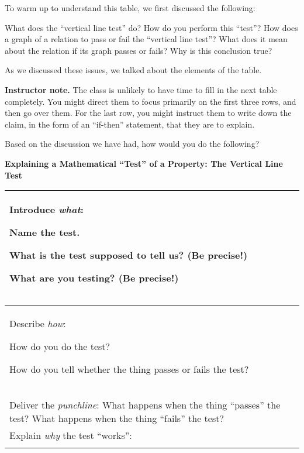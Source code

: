 \documentclass[11pt]{article}
\newcommand\smallnote[1]
	{\begin{mdframed}\raggedright  {\bf Instructor note.} {#1} \end{mdframed}}
\newenvironment{task}
	{\begin{mdframed}[linecolor=lightgray, linewidth=3pt]\raggedright}
	{\end{mdframed}}
\theoremstyle{definition}
\begin{document}
To warm up to understand this table, we first discussed the following:

\vspace*{-4pt}
\begin{task}
What does the ``vertical line test'' do? How do you perform this ``test''? How does a graph of a relation to pass or fail the ``vertical line test''? What does it mean about the relation if its graph passes or fails? Why is this conclusion true?
\end{task}

As we discussed these issues, we talked about the elements of the table.


\smallnote{The class is unlikely to have time to fill in the next table completely. You might direct them to focus primarily on the first three rows, and then go over them. For the last row, you might instruct them to write down the claim, in the form of an ``if-then'' statement, that they are to explain.}

\begin{task}
Based on the discussion we have had, how would you do the following?

\begin{center}
{\bf Explaining a Mathematical ``Test'' of a Property: The Vertical Line Test}

\begin{tabular}{|L{4in}|L{1.5in}|}
\hline 
Introduce {\it what}:	
	\begin{itemize*}
	\item Name the test.
	\item What is the test supposed to tell us? (Be precise!) 
	\item What are you testing? (Be precise!) 
	\end{itemize*} \vspace*{-12pt}$\;$
	& 

	\\ \hline 
Describe {\it how}:
	\begin{itemize*}
	\item How do you do the test?
	\item How do you tell whether the thing passes or fails the test?
	\end{itemize*} \vspace*{-12pt}$\;$
	& 

	\\ \hline 
Deliver the {\it punchline}: What happens when the thing ``passes'' the test? What happens when the thing ``fails'' the test?
	& 

	 \\ \hline 
Explain {\it why} the test ``works'': 
	& \\ & 
	\\ \hline 
\end{tabular}
\end{center}
\end{task}
\end{document}

